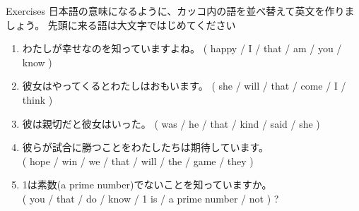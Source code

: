 \documentclass[aspectratio=169,xcolor={dvipsnames,table}]{beamer}
\begin{document}
\begin{frame}[plain]{Exercises}\small
日本語の意味になるように、カッコ内の語を並べ替えて英文を作りましょう。
先頭に来る語は大文字ではじめてください%
\mbox{}\hfill{\scriptsize {}}


\vspace{-5pt}

\begin{enumerate}
 \item わたしが幸せなのを知っていますよね。
( happy / I / that / am / you / know )\\
 \item 彼女はやってくるとわたしはおもいます。
( she / will / that / come / I / think )\\
 \item 彼は親切だと彼女はいった。
( was / he / that / kind / said / she )\\
 \item 彼らが試合に勝つことをわたしたちは期待しています。\\
( hope / win / we / that / will / the / game / they )\\
 \item 1は素数({\scriptsize a prime number})でないことを知っていますか。\\
( you / that / do / know / 1 is / a prime number / not  ) ?\\
\end{enumerate}
\end{frame}
\end{document}
